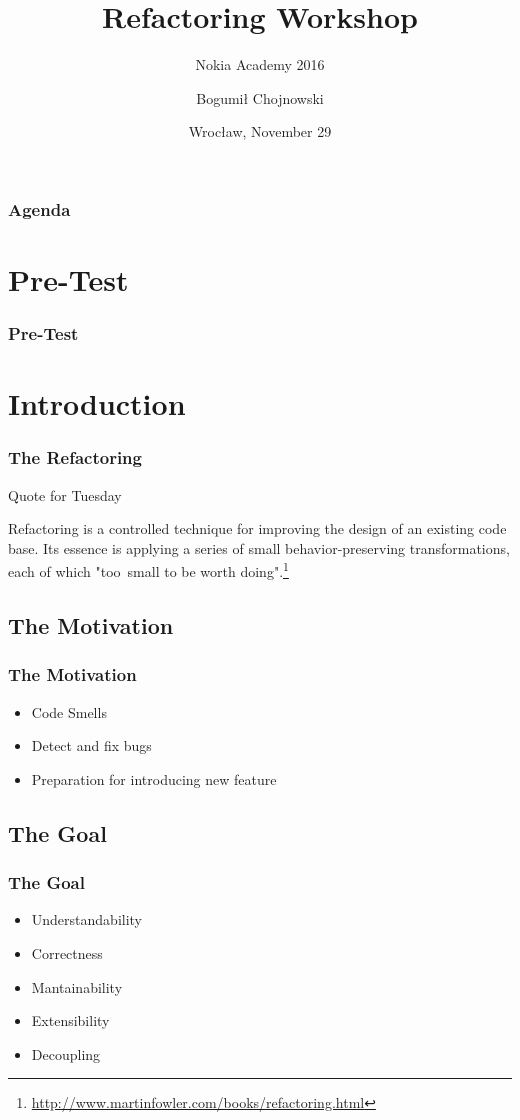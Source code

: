 \documentclass[english,handout]{beamer}
\title{Refactoring Workshop}
\subtitle{Nokia Academy 2016}
\author{Bogumił Chojnowski}
\institute[Nokia]{\textbf{Nokia}}
\date[Nov 29, 2016]{Wrocław, November 29}
\newenvironment{narrowblock}[1]{%
\begin{center}
\begin{minipage}{10.5cm}
\begin{block}{#1}
}{%
\end{block}
\end{minipage}
\end{center}
}
\begin{document}
\begin{frame}[fragile]
    \titlepage
\end{frame}


\begin{frame}
\frametitle{Agenda}
	\tableofcontents
\end{frame}

\section{Pre-Test}
\begin{frame}
\frametitle{Pre-Test}
\end{frame}

\section{Introduction}

\begin{frame}
\frametitle{The Refactoring}
\begin{narrowblock}{Quote for Tuesday}

Refactoring is a controlled technique for improving the design of an existing code base. Its essence is applying a series of small behavior-preserving transformations, each of which "too~small to be worth doing".\footnote{{\url{http://www.martinfowler.com/books/refactoring.html}}}
\end{narrowblock}
\end{frame}

\subsection{The Motivation}

\begin{frame}
\frametitle{The Motivation}
\begin{itemize}
\item<1-> Code Smells
\item<2-> Detect and fix bugs
\item<3-> Preparation for introducing new feature
\end{itemize}
\end{frame}

\subsection{The Goal}

\begin{frame}
\frametitle{The Goal}
\begin{itemize}[<+->]
\item Understandability
\item Correctness
\item Mantainability
\item Extensibility
\item Decoupling
\end{itemize}
\end{frame}
\end{document}
